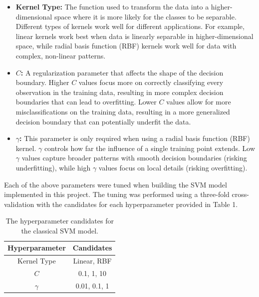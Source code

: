 \documentclass[11pt, oneside]{article}   	%
\begin{document}
\begin{itemize}

 	\item \textbf{Kernel Type:} The function used to transform the data into a higher-dimensional space where it is more likely for the classes to be separable. Different types of kernels work well for different applications. For example, linear kernels work best when data is linearly separable in higher-dimensional space, while radial basis function (RBF) kernels work well for data with complex, non-linear patterns.
	
	\item \textbf{$C$:} A regularization parameter that affects the shape of the decision boundary. Higher $C$ values focus more on correctly classifying every observation in the training data, resulting in more complex decision boundaries that can lead to overfitting. Lower $C$ values allow for more misclassifications on the training data, resulting in a more generalized decision boundary that can potentially underfit the data.
	
	\item \textbf{$\gamma$:} This parameter is only required when using a radial basis function (RBF) kernel. $\gamma$ controls how far the influence of a single training point extends. Low $\gamma$ values capture broader patterns with smooth decision boundaries (risking underfitting), while high $\gamma$ values focus on local details (risking overfitting).
	
\end{itemize}

Each of the above parameters were tuned when building the SVM model implemented in this project. The tuning was performed using a three-fold cross-validation with the candidates for each hyperparameter provided in Table 1.

\begin{table}[h!]
	\centering
	\begin{tabular}{|c|c|}
		\hline
		\textbf{Hyperparameter} & \textbf{Candidates} \\ \hline
		Kernel Type & Linear, RBF \\ \hline
		$C$  & 0.1, 1, 10 \\ \hline
		$\gamma$ & 0.01, 0.1, 1 \\ \hline
	\end{tabular}
    	\caption{The hyperparameter candidates for the classical SVM model.}
    	\label{tab1}
\end{table}
\end{document}
